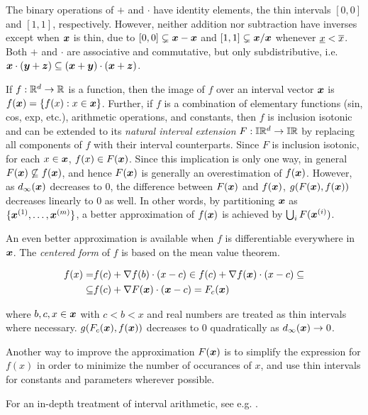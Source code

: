 \documentclass[../rigorous-computation.tex]{subfile}
\begin{document}
  The binary operations of $+$ and $\cdot$ have identity elements, the thin intervals $[0,0]$ and $[1,1]$, respectively.
  However, neither addition nor subtraction have inverses except when $\x$ is thin, 
  due to $[0,0] \subsetneq \x - \x$ and $[1,1] \subsetneq \x / \x$ whenever $\underline x < \overline x$.
  Both $+$ and $\cdot$ are associative and commutative, but only subdistributive, i.e. $\x \cdot (\y + \z) \subseteq (\x + \y) \cdot (\x + \z)$.

  If $f : \mathbb{R}^d \to \mathbb{R}$ is a function, 
  then the image of $f$ over an interval vector $\x$ is 
  $f(\x) = \{ f(x) : x \in \x \}$. 
  Further, if $f$ is a combination of elementary functions (sin, cos, exp, etc.), 
  arithmetic operations, and constants, 
  then $f$ is inclusion isotonic and can be extended to its 
  \textit{natural interval extension} $F : \mathbb{I} \mathbb{R}^d \to \mathbb{I} \mathbb{R}$ by 
  replacing all components of $f$ with their interval counterparts.
  Since $F$ is inclusion isotonic, for each $x \in \x$, $f(x) \in F(\x)$.
  Since this implication is only one way, 
  in general $F(\x) \not\subseteq f(\x)$, 
  and hence $F(\x)$ is generally an overestimation of $f(\x)$.
  However, as $\dm(\x)$ decreases to 0, 
  the difference between $F(\x)$ and $f(\x)$, $g(F(\x),f(\x))$ 
  decreases linearly to 0 as well.
  In other words, by partitioning $\x$ as $\{\x^{(1)},\dots,\x^{(m)}\}$, 
  a better approximation of $f(\x)$ is achieved by $\bigcup_i F(\x^{(i)})$.

  An even better approximation is available when $f$ is 
  differentiable everywhere in $\x$.
  The \textit{centered form} of $f$ is based on the mean value theorem.

  \begin{align*}
    f(x) = & f(c) + \nabla f(b) \cdot (x - c) \in f(c) + \nabla f(\x) \cdot (x - c) \subseteq \\
    \subseteq & f(c) + \nabla F(\x) \cdot (\x - c) = F_c(\x)
  \end{align*}

  where $b,c,x \in \x$ with $c < b < x$ and real numbers are 
  treated as thin intervals where necessary.
  $g(F_c(\x),f(\x))$ decreases to 0 quadratically as $\dm (\x) \to 0$.

  Another way to improve the approximation $F(\x)$ is to 
  simplify the expression for $f(x)$ in order to 
  minimize the number of occurances of $x$, and 
  use thin intervals for constants and parameters wherever possible.

  For an in-depth treatment of interval arithmetic, see e.g. \cite{toolbox-hammer}.
  

  
\end{document}
